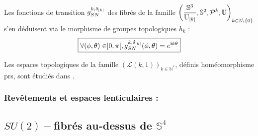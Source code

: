 \ligneinter
Les fonctions de transition $g_{SN}^{k,\delta_{\abs{k}}}$ des fibr\'es de la famille $\left(\lt[\abs{k}],\mathbb{S}^2,\mathcal{P}^k,\mathbb{U}\right)_{k\in\mathbb{Z}\setminus\{0\}}$ %
s'en d\'eduisent via le morphisme de groupes topologiques $h_k$ :
\[\boxed{\forall (\phi,\theta)\in ]0,\pi [,g_{SN}^{k,\delta_{\abs{k}}}(\phi,\theta)=\ec{k\theta}}\]

\begin{rema}
Les espaces topologiques de la famille $(\mathcal{L}(k,1))_{k\in\mathbb{N}^{\ast}}$, d\'efinis  hom\'eomorphisme prs, %
sont \'etudi\'es dans \cite{Lens}.
\end{rema}

\subsubsection{Rev\^etements et espaces lenticulaires :}

\subsection{$SU(2)-$fibr\'es au-dessus de $\mathbb{S}^4$}

